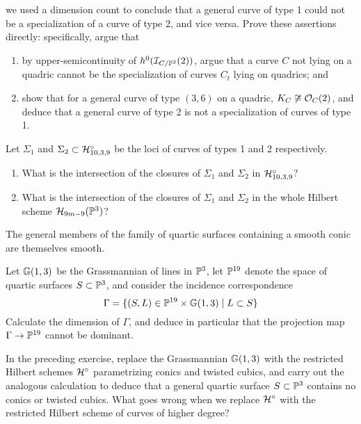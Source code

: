 \begin{exercise}
 we used a dimension count to conclude that a general curve of type 1 could not be a specialization of a curve of type 2, and vice versa. Prove these assertions directly: specifically, argue that
\begin{enumerate}
\item by upper-semicontinuity of $h^0(\cI_{C/\PP^3}(2))$, argue that a curve $C$ not lying on a quadric cannot be the specialization of curves $C_t$ lying on quadrics; and
\item show that for a general curve of type $(3,6)$ on a quadric, $K_C \not\cong \cO_C(2)$, and deduce that a general curve of type 2 is not a specialization of curves of type 1.
\end{enumerate}
\end{exercise}

\begin{exercise}
Let $\Sigma_1$ and $\Sigma_2 \subset \cH^\circ_{10,3,9}$ be the loci of curves of types 1 and 2 respectively. 
\begin{enumerate}
\item What is the intersection of the closures of $\Sigma_1$ and $\Sigma_2$ in $ \cH^\circ_{10,3,9}$?
\item What is the intersection of the closures of $\Sigma_1$ and $\Sigma_2$ in the whole Hilbert scheme $\cH_{9m-9}(\PP^3)$?
\end{enumerate}
\end{exercise}

\begin{exercise}\label{smooth quartic surfaces}
The general members of the family of quartic surfaces containing a smooth conic are themselves smooth. %
\end{exercise}

\begin{exercise}\label{lines on quartic}
Let $\GG(1,3)$ be the Grassmannian of lines in $\PP^3$, let $\PP^{19}$ denote the space of quartic surfaces $S \subset \PP^3$, and consider the incidence correspondence
$$
\Gamma = \{ (S, L) \in \PP^{19} \times \GG(1,3) \mid L \subset S \}
$$
Calculate the dimension of $\Gamma$, and deduce in particular that the projection map $\Gamma \to \PP^{19}$ cannot be dominant.
\end{exercise} 


\begin{exercise}\label{conics on quartic} In the preceding exercise, replace the Grassmannian $\GG(1,3)$ with the restricted Hilbert schemes $\cH^\circ$ parametrizing conics and twisted cubics, and carry out the analogous calculation to deduce that a general quartic surface $S \subset \PP^3$ contains no conics or twisted cubics. What goes wrong when we replace $\cH^\circ$ with the restricted Hilbert scheme of curves of higher degree?
\end{exercise} 


